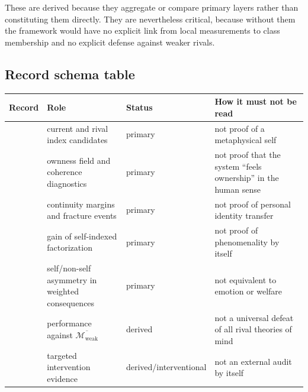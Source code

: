 \documentclass[11pt,a4paper]{article}
\theoremstyle{definition}
\newcommand{\WeakFam}{\mathcal{M}_{\mathrm{weak}}}
\newcommand{\WeakClosure}{\overline{\WeakFam}}
\begin{document}
These are derived because they aggregate or compare primary layers rather than constituting them directly. They are nevertheless critical, because without them the framework would have no explicit link from local measurements to class membership and no explicit defense against weaker rivals.
\subsection{Record schema table}
\begin{table}[t]
\small
\begin{tabularx}{\textwidth}{@{}p{}p{}p{}Y@{}}
\toprule
\textbf{Record} & \textbf{Role} & \textbf{Status} & \textbf{How it must not be read} \\
\midrule
\texttt{\allowbreak{}\allowbreak{}} & current and rival index candidates & primary & not proof of a metaphysical self \\
\texttt{\allowbreak{}\allowbreak{}\allowbreak{}\allowbreak{}} & ownness field and coherence diagnostics & primary & not proof that the system ``feels ownership'' in the human sense \\
\texttt{\allowbreak{}\allowbreak{}\allowbreak{}\allowbreak{}} & continuity margins and fracture events & primary & not proof of personal identity transfer \\
\texttt{\allowbreak{}\allowbreak{}\allowbreak{}\allowbreak{}} & gain of self-indexed factorization & primary & not proof of phenomenality by itself \\
\texttt{\allowbreak{}\allowbreak{}\allowbreak{}\allowbreak{}} & self/non-self asymmetry in weighted consequences & primary & not equivalent to emotion or welfare \\
\texttt{\allowbreak{}\allowbreak{}\allowbreak{}\allowbreak{}} & performance against $\WeakClosure$ & derived & not a universal defeat of all rival theories of mind \\
\texttt{\allowbreak{}\allowbreak{}\allowbreak{}} & targeted intervention evidence & derived/\allowbreak inter\-ventional & not an external audit by itself \\

\end{tabularx}
\end{table}
\end{document}
